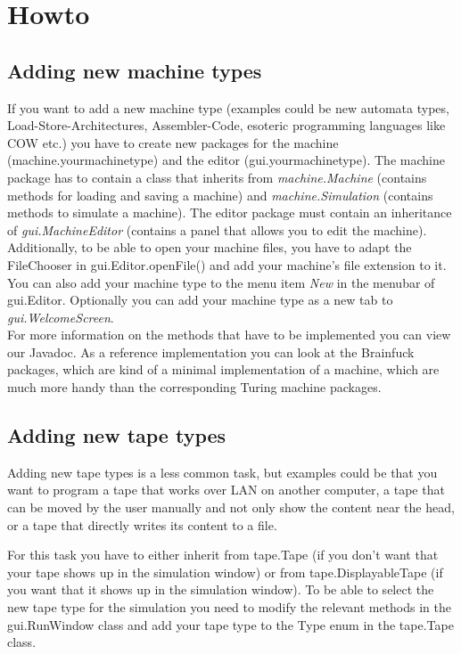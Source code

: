 \documentclass[%
  a4paper,%
  11pt,%
  blue,%
  hyperref	%
  ]{tubsartcl}
\begin{document}
\section{Howto}
\label{sec:howto-add-new}

\subsection{Adding new machine types}

If you want to add a new machine type (examples could be new automata types, Load-Store-Architectures, Assembler-Code, esoteric programming languages like COW etc.) you have to create new packages for the machine (machine.yourmachinetype) and the editor (gui.yourmachinetype). The machine package has to contain a class that inherits from \emph{machine.Machine} (contains methods for loading and saving a machine) and \emph{machine.Simulation} (contains methods to simulate a machine). The editor package must contain an inheritance of \emph{gui.MachineEditor} (contains a panel that allows you to edit the machine). 
Additionally, to be able to open your machine files, you have to adapt the FileChooser in gui.Editor.openFile() and add your machine's file extension to it. \\
You can also add your machine type to the menu item \textit{New} in the menubar of gui.Editor. Optionally you can add your machine type as a new tab to \emph{gui.WelcomeScreen}.\\
For more information on the methods that have to be implemented you can view our Javadoc. As a reference implementation you can look at the Brainfuck packages, which are kind of a minimal implementation of a machine, which are much more handy than the corresponding Turing machine packages.

\subsection{Adding new tape types}

Adding new tape types is a less common task, but examples could be that you want to program a tape that works over LAN on another computer, a tape that can be moved by the user manually and not only show the content near the head, or a tape that directly writes its content to a file.

For this task you have to either inherit from tape.Tape (if you don't want that your tape shows up in the simulation window) or from tape.DisplayableTape (if you want that it shows up in the simulation window). To be able to select the new tape type for the simulation you need to modify the relevant methods in the gui.RunWindow class and add your tape type to the Type enum in the tape.Tape class.
\end{document}
